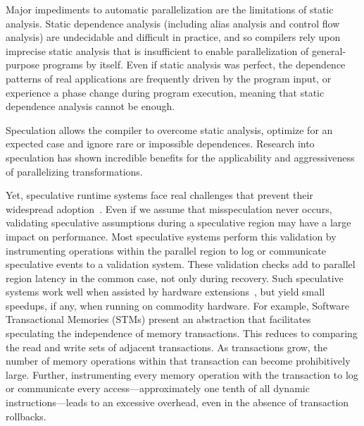 Major impediments to automatic parallelization are the limitations of static
analysis. Static dependence analysis (including alias analysis and control flow
analysis) are undecidable and difficult in practice, and so compilers rely upon
imprecise static analysis that is insufficient to enable parallelization of
general-purpose programs by itself.
%
Even if static analysis was perfect, the dependence patterns of real
applications are frequently driven by the program input, or experience a phase
change during program execution, meaning that static dependence analysis cannot
be enough.

Speculation allows the compiler to overcome static analysis, optimize for an
expected
case and ignore rare or impossible dependences.  Research into speculation has
shown incredible benefits for the applicability and aggressiveness of
parallelizing transformations.

Yet, speculative runtime systems face real challenges that prevent their
widespread adoption~\cite{cascaval:08:stmtoy:short, ..}. Even if we assume that
misspeculation never occurs, validating speculative assumptions during a
speculative region may have a large impact on performance.
%
Most speculative systems perform this validation by instrumenting operations
within the parallel region to log or communicate speculative events to a
validation system.  These validation checks add to parallel region latency in
the common case, not only during recovery.
%
Such speculative systems work well when assisted by hardware
extensions~\cite{..}, but yield small speedups, if any, when running on
commodity hardware.
%
For example, Software Transactional Memories (STMs) present an abstraction that
facilitates speculating the independence of memory transactions.  This reduces
to comparing the read and write sets of adjacent transactions.  As transactions
grow, the number of memory operations within that transaction can become
prohibitively large. Further, instrumenting every memory operation with the
transaction to log or communicate every access---approximately one tenth of all
dynamic instructions---leads to an excessive overhead, even in the absence of
transaction rollbacks.

